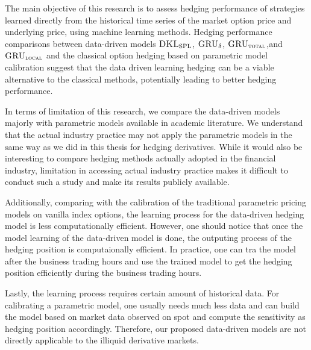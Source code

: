 \documentclass[letterpaper,12pt,titlepage,oneside,final]{book}
\numberwithin{equation}{section}
\theoremstyle{definition}
\newcommand{\model}{\textsc{GRU}_\delta}
\newcommand{\modelT}{\textsc{GRU}_{\textsc{total}}}
\newcommand{\modelL}{\textsc{GRU}_{\textsc{local}}}
\newcommand{\DKLs}{\bf\textsc{DKL}_{\text{SPL}}}
\begin{document}
The main objective of this research  is to assess hedging performance of strategies learned  directly from the  historical time series of the market option price and underlying price,  using machine learning methods. Hedging  performance comparisons between data-driven  models $\DKLs$, $\model$, $\modelT$,and  $\modelL$ and the  classical  option hedging based on parametric model calibration suggest that the data driven  learning hedging can be a viable alternative to the classical methods,  potentially leading to better hedging performance.  

In terms of limitation of this research, we compare the data-driven models majorly with parametric models available in academic literature.  We understand that the actual industry practice may not apply the parametric models in the same way as we did in this thesis for hedging derivatives.
While it would also  be interesting to compare hedging methods actually adopted in the financial industry,   limitation in accessing actual industry practice makes it difficult to conduct such a study and make its results publicly available.

Additionally, comparing with the calibration of the traditional parametric pricing models on vanilla index options, the learning process for the data-driven hedging model is less computationally efficient. However, one should notice that once the model learning of the data-driven model is done, the outputing process of the hedging position is computaionally efficient. In practice, one can tra the model after the business trading hours and use  the trained model to get the hedging position efficiently  during the business trading hours.

Lastly, the learning process requires certain amount of historical data. For calibrating a parametric model, one usually needs much less data and  can  build the model based on market data observed on spot and compute the sensitivity as hedging position accordingly.  Therefore, our proposed data-driven models are not directly applicable to the illiquid derivative markets.  
\end{document}
